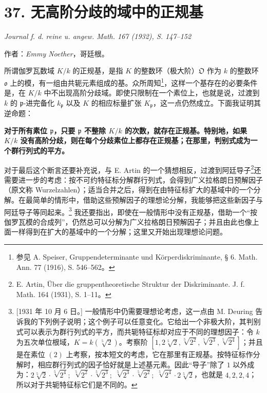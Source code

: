 \documentclass[11pt]{article}
\newcommand{\frakO}{\mathfrak O}
\newcommand{\frako}{\mathfrak o}
\newcommand{\frakp}{\mathfrak p}
\newcommand{\srcemph}[1]{\textbf{#1}}
\begin{document}
\setcounter{footnote}{0}
\section*{37. 无高阶分歧的域中的正规基}

\begin{center}
\emph{Journal f. d. reine u. angew. Math. 167 (1932), S. 147--152}
\end{center}

\begin{center}
作者：\emph{Emmy Noether}，哥廷根。
\end{center}

所谓伽罗瓦数域 \(K/k\) 的正规基，是指 \(K\) 的整数环（极大阶）\(\frakO\) 作为 \(k\) 的整数环 \(\frako\) 上的模，有一组由共轭元素组成的基。众所周知\footnote{参见 A. Speiser, Gruppendeterminante und Körperdiskriminante, § 6. Math. Ann. 77 (1916), S. 546--562。}，这样一个基存在的必要条件是，在 \(K/k\) 中不出现高阶分歧域。即使只限制在一个素位上，也就是说，过渡到 \(k\) 的 \(\frakp\)-进完备化 \(k_\frakp\) 以及 \(K\) 的相应标量扩张 \(K_\frakp\)，这一点仍然成立。下面我证明其逆命题：

\srcemph{对于所有素位 \(\frakp\)，只要 \(\frakp\) 不整除 \(K/k\) 的次数，就存在正规基。特别地，如果 \(K/k\) 没有高阶分歧，则在每个分歧素位上都存在正规基；在那里，判别式成为一个群行列式的平方。}

对于最后这个断言还要补充说，与 E. Artin 的一个猜想相反，过渡到阿廷导子\footnote{E. Artin, Über die gruppentheoretische Struktur der Diskriminante. J. f. Math. 164 (1931), S. 1--11。}还需要进一步的考虑：按不可约特征标分解群行列式，会得到广义拉格朗日预解因子（原文称 Wurzelzahlen）；适当合并之后，得到在由特征标扩大的基域中的一个分解。在最简单的情形中，借助这些预解因子的理想论分解，我能够把这些新因子与阿廷导子等同起来。\footnote{[1931 年 10 月 6 日。] 一般情形中仍需要理想论考虑，这一点由 M. Deuring 告诉我的下列例子说明；这个例子可以任意变化。它给出一个非极大阶，其判别式可以表示为群行列式的平方，而共轭特征标却对应于不同的理想因子：令 \(k\) 为五次单位根域，\(K=k(\sqrt[5]{2})\)。考察阶
\([1,2\sqrt[5]{2},\sqrt[5]{2^2},\sqrt[5]{2^3},\sqrt[5]{2^4}]\)；并且是在素位 \((2)\) 上考察，按本短文的考虑，它在那里有正规基。按特征标作分解时，相应群行列式的因子恰好就是上述基元素。因此“导子”除了 \(1\) 以外成为：\(2\sqrt[5]{2}\cdot\sqrt[5]{2^4};\;\sqrt[5]{2^2}\cdot\sqrt[5]{2^3};\;\sqrt[5]{2^3}\cdot\sqrt[5]{2^2};\;\sqrt[5]{2^4}\cdot 2\sqrt[5]{2}\)，也就是 \(4,2,2,4\)；所以对于共轭特征标它们是不同的。} 我还要指出，即使在一般情形中没有正规基，借助一个“按伽罗瓦模的合成列”，仍然总可以分解为广义拉格朗日预解因子；并且由此也像上面一样得到在扩大的基域中的一个分解；这里又开始出现理想论问题。
\end{document}
